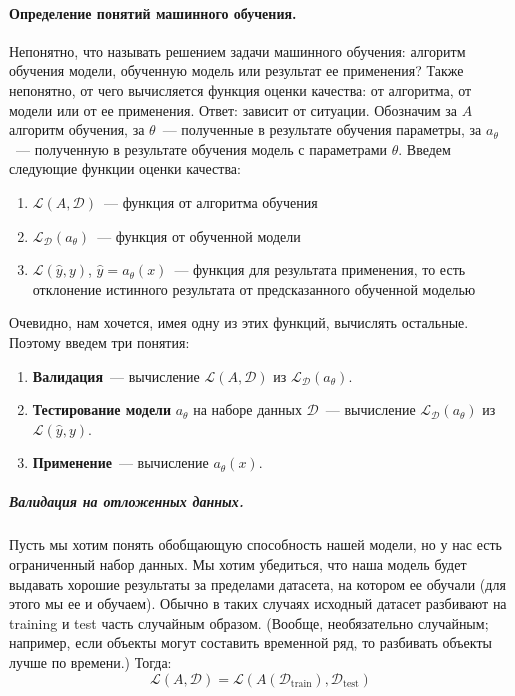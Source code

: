 \documentclass{article}
\begin{document}
    \paragraph{Определение понятий машинного обучения.}
    Непонятно, что называть решением задачи машинного обучения: алгоритм обучения модели, обученную модель или результат ее применения? Также непонятно, от чего вычисляется функция оценки качества: от алгоритма, от модели или от ее применения. Ответ: зависит от ситуации. Обозначим за $A$ алгоритм обучения, за $\theta$~--- полученные в результате обучения параметры, за $a_{\theta}$~--- полученную в результате обучения модель с параметрами $\theta$. Введем следующие функции оценки качества:
    \begin{enumerate}
        \item $\mathcal{L}(A,\mathcal{D})$~--- функция от алгоритма обучения
        \item $\mathcal{L}_{\mathcal{D}}(a_{\theta})$~--- функция от обученной модели
        \item $\mathcal{L}(\hat{y}, y)$, $\hat{y}=a_{\theta}(x)$~--- функция для результата применения, то есть отклонение истинного результата от предсказанного обученной моделью
    \end{enumerate}
    Очевидно, нам хочется, имея одну из этих функций, вычислять остальные. Поэтому введем три понятия:
    \begin{enumerate}
        \item \textbf{Валидация}~--- вычисление $\mathcal{L}(A,\mathcal{D})$ из $\mathcal{L}_{\mathcal{D}}(a_{\theta})$.
        \item \textbf{Тестирование модели} $a_{\theta}$ на наборе данных $\mathcal{D}$~--- вычисление $\mathcal{L}_{\mathcal{D}}(a_{\theta})$ из $\mathcal{L}(\hat{y},y)$.
        \item \textbf{Применение}~--- вычисление $a_{\theta}(x)$.
    \end{enumerate}
    \subparagraph{Валидация на отложенных данных.}
    Пусть мы хотим понять обобщающую способность нашей модели, но у нас есть ограниченный набор данных. Мы хотим убедиться, что наша модель будет выдавать хорошие результаты за пределами датасета, на котором ее обучали (для этого мы ее и обучаем). Обычно в таких случаях исходный датасет разбивают на training и test часть случайным образом. (Вообще, необязательно случайным; например, если объекты могут составить временной ряд, то разбивать объекты лучше по времени.) Тогда:
    \[\mathcal{L}(A,\mathcal{D})=\mathcal{L}(A(\mathcal{D}_{\mathrm{train}}),\mathcal{D}_{\mathrm{test}})\]
\end{document}
